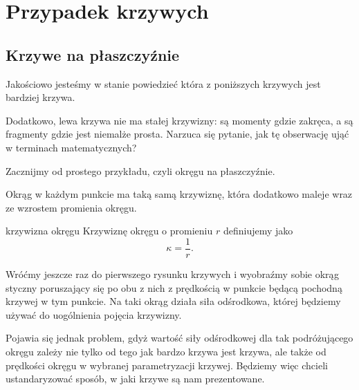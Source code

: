 \section{Przypadek krzywych}

\subsection{Krzywe na płaszczyźnie}

Jakościowo jesteśmy w stanie powiedzieć która z poniższych krzywych jest bardziej krzywa. 
\begin{center}
\end{center}
Dodatkowo, lewa krzywa nie ma stałej krzywizny: są momenty gdzie zakręca, a są fragmenty gdzie jest niemalże prosta. Narzuca się pytanie, jak tę obserwację ująć w terminach matematycznych?

Zacznijmy od prostego przykładu, czyli okręgu na płaszczyźnie.
\begin{center}
\end{center}
Okrąg w każdym punkcie ma taką samą krzywiznę, która dodatkowo maleje wraz ze wzrostem promienia okręgu.

\begin{definition}{krzywizna okręgu}{}
  Krzywiznę okręgu o promieniu $r$ definiujemy jako
  $$\kappa=\frac{1}{r}.$$
\end{definition}

Wróćmy jeszcze raz do pierwszego rysunku krzywych i wyobraźmy sobie okrąg styczny poruszający się po obu z nich z prędkością w punkcie będącą pochodną krzywej w tym punkcie. Na taki okrąg działa siła odśrodkowa, której będziemy używać do uogólnienia pojęcia krzywizny. 

Pojawia się jednak problem, gdyż wartość siły odśrodkowej dla tak podróżującego okręgu zależy nie tylko od tego jak bardzo krzywa jest krzywa, ale także od prędkości okręgu w wybranej parametryzacji krzywej. Będziemy więc chcieli ustandaryzować sposób, w jaki krzywe są nam prezentowane.

